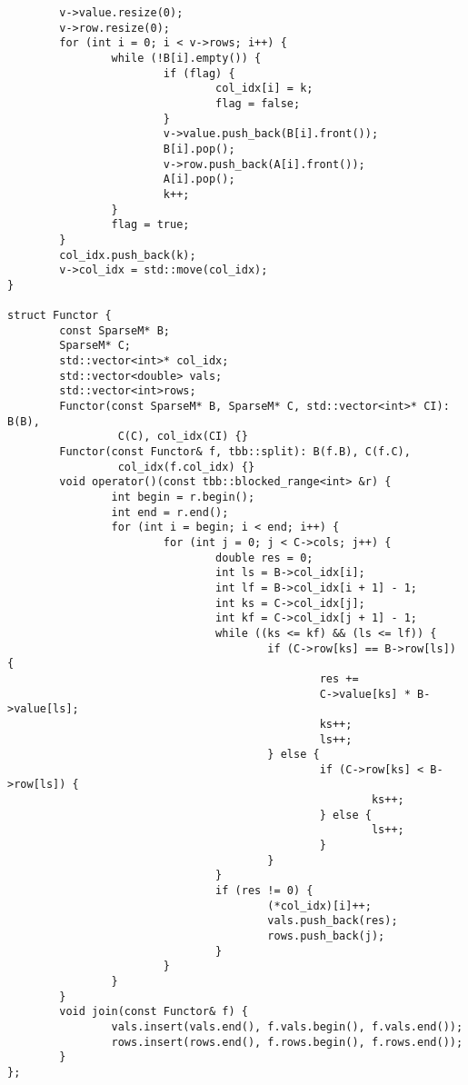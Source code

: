 \documentclass{report}
\begin{document}
\begin{lstlisting}
        v->value.resize(0);
        v->row.resize(0);
        for (int i = 0; i < v->rows; i++) {
                while (!B[i].empty()) {
                        if (flag) {
                                col_idx[i] = k;
                                flag = false;
                        }
                        v->value.push_back(B[i].front());
                        B[i].pop();
                        v->row.push_back(A[i].front());
                        A[i].pop();
                        k++;
                }
                flag = true;
        }
        col_idx.push_back(k);
        v->col_idx = std::move(col_idx);
}

struct Functor {
        const SparseM* B;
        SparseM* C;
        std::vector<int>* col_idx;
        std::vector<double> vals;
        std::vector<int>rows;
        Functor(const SparseM* B, SparseM* C, std::vector<int>* CI): B(B),
                 C(C), col_idx(CI) {}
        Functor(const Functor& f, tbb::split): B(f.B), C(f.C),
                 col_idx(f.col_idx) {}
        void operator()(const tbb::blocked_range<int> &r) {
                int begin = r.begin();
                int end = r.end();
                for (int i = begin; i < end; i++) {
                        for (int j = 0; j < C->cols; j++) {
                                double res = 0;
                                int ls = B->col_idx[i];
                                int lf = B->col_idx[i + 1] - 1;
                                int ks = C->col_idx[j];
                                int kf = C->col_idx[j + 1] - 1;
                                while ((ks <= kf) && (ls <= lf)) {
                                        if (C->row[ks] == B->row[ls]) {
                                                res +=
                                                C->value[ks] * B->value[ls];
                                                ks++;
                                                ls++;
                                        } else {
                                                if (C->row[ks] < B->row[ls]) {
                                                        ks++;
                                                } else {
                                                        ls++;
                                                }
                                        }
                                }
                                if (res != 0) {
                                        (*col_idx)[i]++;
                                        vals.push_back(res);
                                        rows.push_back(j);
                                }
                        }
                }
        }
        void join(const Functor& f) {
                vals.insert(vals.end(), f.vals.begin(), f.vals.end());
                rows.insert(rows.end(), f.rows.begin(), f.rows.end());
        }
};


\end{lstlisting}
\end{document}
